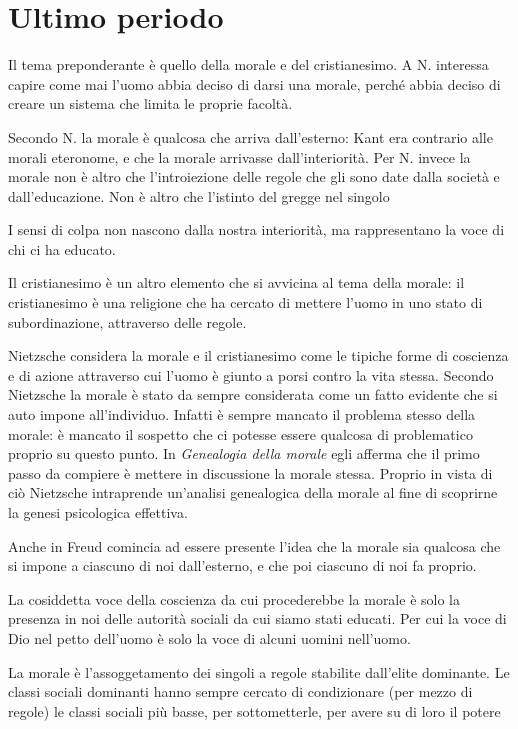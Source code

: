 \documentclass[a4paper, twoside, titlepage]{book}
\begin{document}
\chapter{Ultimo periodo}

Il tema preponderante è quello della morale e del cristianesimo.
A N. interessa capire come mai l'uomo abbia deciso di darsi una morale, perché abbia deciso di creare un sistema che limita le proprie facoltà.

Secondo N. la morale è qualcosa che arriva dall'esterno: Kant era contrario alle morali eteronome, e che la morale arrivasse dall'interiorità.
Per N. invece la morale non è altro che l'introiezione delle regole che gli sono date dalla società e dall'educazione. Non è altro che l'istinto del gregge nel singolo

I sensi di colpa non nascono dalla nostra interiorità, ma rappresentano la voce di chi ci ha educato.

Il cristianesimo è un altro elemento che si avvicina al tema della morale: il cristianesimo è una religione che ha cercato di mettere l'uomo in uno stato di subordinazione, attraverso delle regole.

Nietzsche considera la morale e il cristianesimo come le tipiche forme di coscienza e di azione attraverso cui l'uomo è giunto a porsi contro la vita stessa. Secondo Nietzsche la morale è stato da sempre considerata come un fatto evidente che si auto impone all'individuo. Infatti è sempre mancato il problema stesso della morale: è mancato il sospetto che ci potesse essere qualcosa di problematico proprio su questo punto. In \textit{Genealogia della morale} egli afferma che il primo passo da compiere è mettere in discussione la morale stessa. Proprio in vista di ciò Nietzsche intraprende un'analisi genealogica della morale al fine di scoprirne la genesi psicologica effettiva.

Anche in Freud comincia ad essere presente l'idea che la morale sia qualcosa che si impone a ciascuno di noi dall'esterno, e che poi ciascuno di noi fa proprio.

La cosiddetta voce della coscienza da cui procederebbe la morale è solo la presenza in noi delle autorità sociali da cui siamo stati educati. Per cui la voce di Dio nel petto dell'uomo è solo la voce di alcuni uomini nell'uomo.

La morale è l'assoggetamento dei singoli a regole stabilite dall'elite dominante. Le classi sociali dominanti hanno sempre cercato di condizionare (per mezzo di regole) le classi sociali più basse, per sottometterle, per avere su di loro il potere
\end{document}
